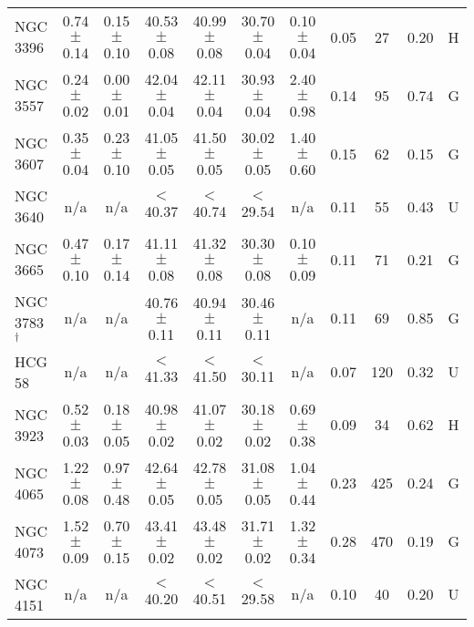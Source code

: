 \begin{table*}
\begin{center}
\begin{tabular}{@{}lcccccccccl@{}}
NGC 3396             &  0.74 $\pm$ 0.14  &  0.15 $\pm$ 0.10  &  40.53 $\pm$ 0.08  &  40.99  $\pm$ 0.08  &  30.70 $\pm$ 0.04  &  0.10 $\pm$ 0.04  &  0.05         &  27                 &  0.20                &  H      \\
NGC 3557             &  0.24 $\pm$ 0.02  &  0.00 $\pm$ 0.01  &  42.04 $\pm$ 0.04  &  42.11  $\pm$ 0.04  &  30.93 $\pm$ 0.04  &  2.40 $\pm$ 0.98  &  0.14         &  95                 &  0.74                &  G      \\
NGC 3607             &  0.35 $\pm$ 0.04  &  0.23 $\pm$ 0.10  &  41.05 $\pm$ 0.05  &  41.50  $\pm$ 0.05  &  30.02 $\pm$ 0.05  &  1.40 $\pm$ 0.60  &  0.15         &  62                 &  0.15                &  G      \\
NGC 3640             &  n/a              &  n/a              &  $<$40.37          &  $<$40.74           &  $<$29.54          &  n/a              &  0.11         &  55                 &  0.43                &  U      \\
NGC 3665             &  0.47 $\pm$ 0.10  &  0.17 $\pm$ 0.14  &  41.11 $\pm$ 0.08  &  41.32  $\pm$ 0.08  &  30.30 $\pm$ 0.08  &  0.10 $\pm$ 0.09  &  0.11         &  71                 &  0.21                &  G      \\
NGC 3783$^{\dagger}$ &  n/a              &  n/a              &  40.76 $\pm$ 0.11  &  40.94  $\pm$ 0.11  &  30.46 $\pm$ 0.11  &  n/a              &  0.11         &  69                 &  0.85                &  G      \\
HCG 58               &  n/a              &  n/a              &  $<$41.33          &  $<$41.50           &  $<$30.11          &  n/a              &  0.07         &  120                &  0.32                &  U      \\
NGC 3923             &  0.52 $\pm$ 0.03  &  0.18 $\pm$ 0.05  &  40.98 $\pm$ 0.02  &  41.07  $\pm$ 0.02  &  30.18 $\pm$ 0.02  &  0.69 $\pm$ 0.38  &  0.09         &  34                 &  0.62                &  H      \\
NGC 4065             &  1.22 $\pm$ 0.08  &  0.97 $\pm$ 0.48  &  42.64 $\pm$ 0.05  &  42.78  $\pm$ 0.05  &  31.08 $\pm$ 0.05  &  1.04 $\pm$ 0.44  &  0.23         &  425                &  0.24                &  G      \\
NGC 4073             &  1.52 $\pm$ 0.09  &  0.70 $\pm$ 0.15  &  43.41 $\pm$ 0.02  &  43.48  $\pm$ 0.02  &  31.71 $\pm$ 0.02  &  1.32 $\pm$ 0.34  &  0.28         &  470                &  0.19                &  G      \\
NGC 4151             &  n/a              &  n/a              &  $<$40.20          &  $<$40.51           &  $<$29.58          &  n/a              &  0.10         &  40                 &  0.20                &  U      \\

\end{tabular}
\end{center}
\end{table*}

